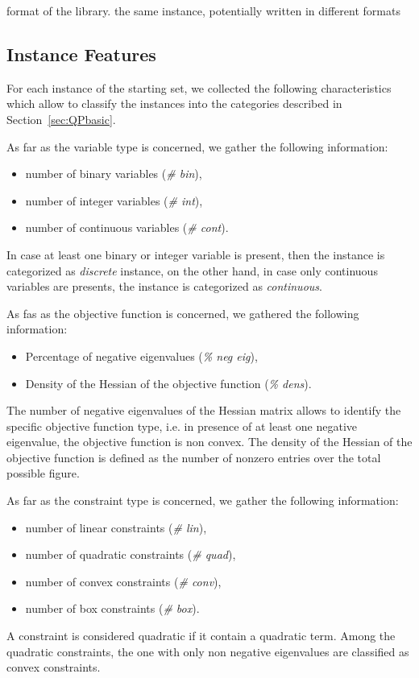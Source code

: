 format of the library. %
the same instance, potentially written in different formats



\subsection{Instance Features}\label{subsec:feature}

For each instance of the starting set, we collected the following
characteristics which allow to classify the instances into the
categories described in Section~\ref{sec:QPbasic}.


As far as the variable type is concerned, we gather the following information:
\begin{itemize}
\item number of binary variables (\emph{\# bin}),
\item number of integer variables (\emph{\# int}),
\item number of continuous variables (\emph{\# cont}).
\end{itemize}
In case at least one binary or integer variable is present, then the
instance is categorized as \emph{discrete} instance, on the other
hand, in case only continuous variables are presents, the instance is
categorized as \emph{continuous}.

As fas as the objective function is concerned, we gathered the
following information:
\begin{itemize}
\item Percentage of negative eigenvalues (\emph{\% neg eig}),
\item Density of the Hessian of the objective function (\emph{\% dens}).
\end{itemize}
 The number of negative eigenvalues of the Hessian matrix allows to
identify the specific objective function type, i.e. in presence of at
least one negative eigenvalue, the objective function is non convex.
The density of the Hessian of the objective function is defined as the
number of nonzero entries     over the total possible figure.

As far as the constraint type is concerned, we gather the following information:
\begin{itemize}
\item number of linear constraints (\emph{\# lin}),
\item number of quadratic constraints (\emph{\# quad}),
\item number of convex constraints (\emph{\# conv}),
\item number of box constraints (\emph{\# box}).
\end{itemize}
A constraint is considered quadratic if it contain a quadratic term.
Among the quadratic constraints, the one with only non negative
eigenvalues are classified as convex constraints.

